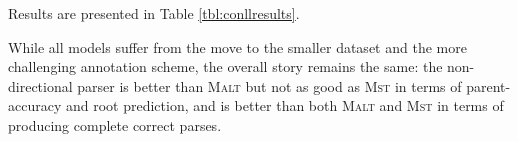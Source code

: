 \documentclass[11pt]{article}
\begin{document}
\begin{table}[t]
   \begin{center}
   \end{center}
   \caption{Unlabeled dependency accuracy on PTB Section 23, automatic POS-tags,  including punctuation.}
   \label{tbl:results}
\end{table}

Results are presented in Table \ref{tbl:conllresults}.

\begin{table}[t]
   \begin{center}
   \end{center}
   \caption{Unlabeled dependency accuracy on CoNLL 2007 English test set, including punctuation.}
\vspace{-7pt}
   \label{tbl:conllresults}
\end{table}

While all models suffer from the move to the smaller dataset and the more challenging annotation scheme, the overall story remains the same:  the non-directional parser is better than \textsc{Malt} but not as good as \textsc{Mst} in terms of parent-accuracy and root prediction, and is better than both \textsc{Malt} and \textsc{Mst} in terms of producing complete correct parses.  %
\end{document}
